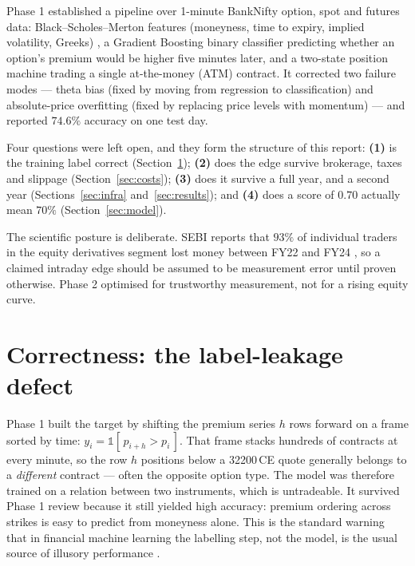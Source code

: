 \documentclass[10pt,a4paper]{article}
\begin{document}
Phase 1 \cite{phase1} established a pipeline over 1-minute BankNifty option,
spot and futures data: Black--Scholes--Merton features (moneyness, time to
expiry, implied volatility, Greeks) \cite{blackscholes}, a Gradient Boosting
binary classifier predicting whether an option's premium would be higher five
minutes later, and a two-state position machine trading a single at-the-money
(ATM) contract. It corrected two failure modes --- theta bias (fixed by moving
from regression to classification) and absolute-price overfitting (fixed by
replacing price levels with momentum) --- and reported $74.6\%$ accuracy on one
test day.

Four questions were left open, and they form the structure of this report:
\textbf{(1)} is the training label correct (Section~\ref{sec:label});
\textbf{(2)} does the edge survive brokerage, taxes and slippage
(Section~\ref{sec:costs}); \textbf{(3)} does it survive a full year, and a
second year (Sections~\ref{sec:infra} and~\ref{sec:results}); and
\textbf{(4)} does a score of $0.70$ actually mean $70\%$
(Section~\ref{sec:model}).

The scientific posture is deliberate. SEBI reports that $93\%$ of individual
traders in the equity derivatives segment lost money between FY22 and FY24
\cite{sebi}, so a claimed intraday edge should be assumed to be measurement
error until proven otherwise. Phase 2 optimised for trustworthy measurement,
not for a rising equity curve.

\section{Correctness: the label-leakage defect}\label{sec:label}

Phase 1 built the target by shifting the premium series $h$ rows forward on a
frame sorted by time:
$y_i = \mathbb{1}[\,p_{i+h} > p_i\,]$.
That frame stacks hundreds of contracts at every minute, so the row $h$
positions below a 32200\,CE quote generally belongs to a \emph{different}
contract --- often the opposite option type. The model was therefore trained on
a relation between two instruments, which is untradeable. It survived Phase 1
review because it still yielded high accuracy: premium ordering across strikes
is easy to predict from moneyness alone. This is the standard warning that in
financial machine learning the labelling step, not the model, is the usual
source of illusory performance \cite{lopezdeprado}.
\end{document}
